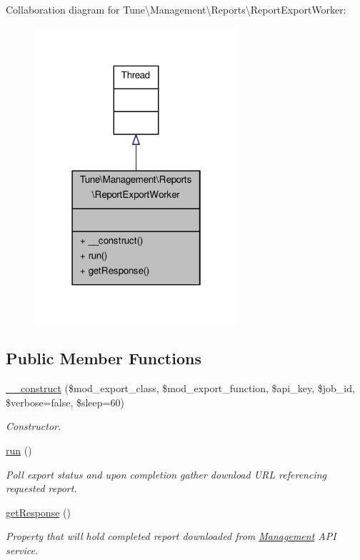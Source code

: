Collaboration diagram for Tune\textbackslash{}Management\textbackslash{}Reports\textbackslash{}Report\-Export\-Worker\-:
\nopagebreak
\begin{figure}[H]
\begin{center}
\leavevmode
\includegraphics[width=214pt]{classTune_1_1Management_1_1Reports_1_1ReportExportWorker__coll__graph}
\end{center}
\end{figure}
\subsection*{Public Member Functions}
\begin{DoxyCompactItemize}
\item 
\hyperlink{classTune_1_1Management_1_1Reports_1_1ReportExportWorker_aa5311f1c14052f030ab7026e39e45f24}{\-\_\-\-\_\-construct} (\$mod\-\_\-export\-\_\-class, \$mod\-\_\-export\-\_\-function, \$api\-\_\-key, \$job\-\_\-id, \$verbose=false, \$sleep=60)
\begin{DoxyCompactList}\small\item\em Constructor. \end{DoxyCompactList}\item 
\hyperlink{classTune_1_1Management_1_1Reports_1_1ReportExportWorker_af686be7659c034935eca1fd7ef073530}{run} ()
\begin{DoxyCompactList}\small\item\em Poll export status and upon completion gather download U\-R\-L referencing requested report. \end{DoxyCompactList}\item 
\hyperlink{classTune_1_1Management_1_1Reports_1_1ReportExportWorker_a5c573a695b7fa6a660d4e7d9d3c02ff6}{get\-Response} ()
\begin{DoxyCompactList}\small\item\em Property that will hold completed report downloaded from \hyperlink{namespaceTune_1_1Management}{Management} A\-P\-I service. \end{DoxyCompactList}\end{DoxyCompactItemize}


